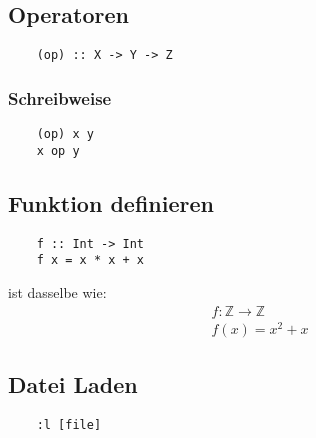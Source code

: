 \documentclass[a4paper]{article}
\begin{document}
\subsection{Operatoren}
\begin{verbatim}
    (op) :: X -> Y -> Z
\end{verbatim}
\subsubsection{Schreibweise}
\begin{verbatim}
    (op) x y 
    x op y 
\end{verbatim}
\subsection{Funktion definieren}
\begin{verbatim}
    f :: Int -> Int
    f x = x * x + x
\end{verbatim}
ist dasselbe wie:
\begin{align*}
    f : \mathbb{Z} \rightarrow \mathbb{Z} \\
    f(x) = x^2 + x
\end{align*}
\subsection{Datei Laden}
\begin{verbatim}
    :l [file]
\end{verbatim}
\end{document}
